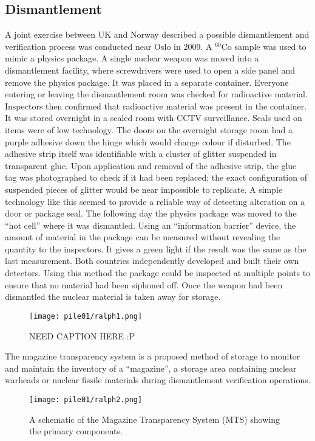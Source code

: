 \documentclass[twoside,titlepage,11pt,twocolumn,a4paper]{article}
\begin{document}
\subsection{Dismantlement}
A joint exercise between UK and Norway described a possible
dismantlement and verification process was conducted near Oslo in
2009. A \( \mathrm{^{60}Co} \) sample was used to mimic a physics
package. A single nuclear weapon was moved into a dismantlement
facility, where screwdrivers were used to open a side panel and remove
the physics package. It was placed in a separate container. Everyone
entering or leaving the dismantlement room was checked for radioactive
material. Inspectors then confirmed that radioactive material was
present in the container. It was stored overnight in a sealed room
with CCTV surveillance. Seals used on items were of low
technology. The doors on the overnight storage room had a purple
adhesive down the hinge which would change colour if disturbed. The
adhesive strip itself was identifiable with a cluster of glitter
suspended in transparent glue. Upon application and removal of the
adhesive strip, the glue tag was photographed to check if it had been
replaced; the exact configuration of suspended pieces of glitter would
be near impossible to replicate. A simple technology like this seemed
to provide a reliable way of detecting alteration on a door or package
seal. The following day the physics package was moved to the ``hot
cell'' where it was dismantled. Using an ``information barrier''
device, the amount of material in the package can be measured without
revealing the quantity to the inspectors. It gives a green light if
the result was the same as the last measurement. Both countries
independently developed and built their own detectors. Using this
method the package could be inspected at multiple points to ensure
that no material had been siphoned off. Once the weapon had been
dismantled the nuclear material is taken away for
storage. \citep{dismantleBBC2009}

\begin{figure}
  \texttt{[image: pile01/ralph1.png]}
	\caption{NEED CAPTION HERE :P \citep{dismantleBBC2009}}
\end{figure}

The magazine transparency system is a proposed method of storage to
monitor and maintain the inventory of a ``magazine'', a storage area
containing nuclear warheads or nuclear fissile materials during
dismantlement verification operations.

\begin{figure}
  \texttt{[image: pile01/ralph2.png]}
  \caption{A schematic of the Magazine Transparency System (MTS) 
    showing the primary components. \citep{gerdes2001}}
\end{figure}
\end{document}
